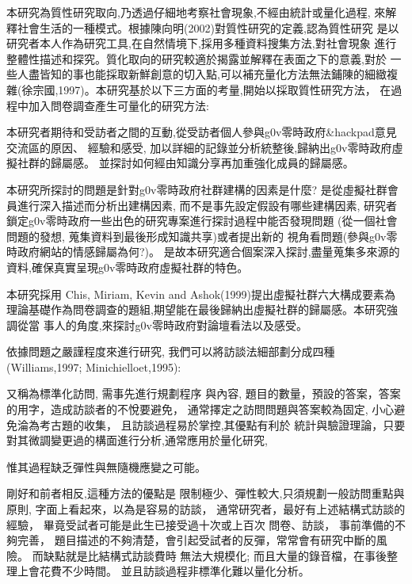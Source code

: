 
本研究為質性研究取向,乃透過仔細地考察社會現象,不經由統計或量化過程,
來解釋社會生活的一種模式。根據陳向明(2002)對質性研究的定義,認為質性研究
是以研究者本人作為研究工具,在自然情境下,採用多種資料搜集方法,對社會現象
進行整體性描述和探究。質化取向的研究較適於揭露並解釋在表面之下的意義,對於
一些人盡皆知的事也能採取新鮮創意的切入點,可以補充量化方法無法鋪陳的細緻複
雜(徐宗國,1997)。本研究基於以下三方面的考量,開始以採取質性研究方法，
在過程中加入問卷調查產生可量化的研究方法:

本研究者期待和受訪者之間的互動,從受訪者個人參與g0v零時政府\&hackpad意見交流區的原因、
經驗和感受,
加以詳細的記錄並分析統整後,歸納出g0v零時政府虛擬社群的歸屬感。
並探討如何經由知識分享再加重強化成員的歸屬感。


本研究所探討的問題是針對g0v零時政府社群建構的因素是什麼?
是從虛擬社群會員進行深入描述而分析出建構因素,
而不是事先設定假設有哪些建構因素,
研究者鎖定g0v零時政府一些出色的研究專案進行探討過程中能否發現問題
(從一個社會問題的發想, 蒐集資料到最後形成知識共享)或者提出新的
視角看問題(參與g0v零時政府網站的情感歸屬為何?)。
是故本研究適合個案深入探討,盡量蒐集多來源的資料,確保真實呈現g0v零時政府虛擬社群的特色。

本研究採用 Chis, Miriam, Kevin and Ashok(1999)提出虛擬社群六大構成要素為
理論基礎作為問卷調查的題組,期望能在最後歸納出虛擬社群的歸屬感。本研究強調從當
事人的角度,來探討g0v零時政府對論壇看法以及感受。





依據問題之嚴謹程度來進行研究,
我們可以將訪談法細部劃分成四種(Williams,1997;
Minichielloet,1995):


又稱為標準化訪問,
需事先進行規劃程序
與內容,
題目的數量，預設的答案，答案的用字，造成訪談者的不悅要避免，
通常擇定之訪問問題與答案較為固定,
小心避免淪為考古題的收集，
且訪談過程易於掌控,其優點有利於
統計與驗證理論，只要對其微調變更過的構面進行分析,通常應用於量化研究,

惟其過程缺乏彈性與無隨機應變之可能。

剛好和前者相反,這種方法的優點是
限制極少、彈性較大,只須規劃一般訪問重點與原則,
字面上看起來，以為是容易的訪談，
通常研究者，最好有上述結構式訪談的經驗，
畢竟受試者可能是此生已接受過十次或上百次
問卷、訪談，
事前準備的不夠完善，
題目描述的不夠清楚，會引起受試者的反彈，常常會有研究中斷的風險。
而缺點就是比結構式訪談費時
無法大規模化;
而且大量的錄音檔，在事後整理上會花費不少時間。
並且訪談過程非標準化難以量化分析。

